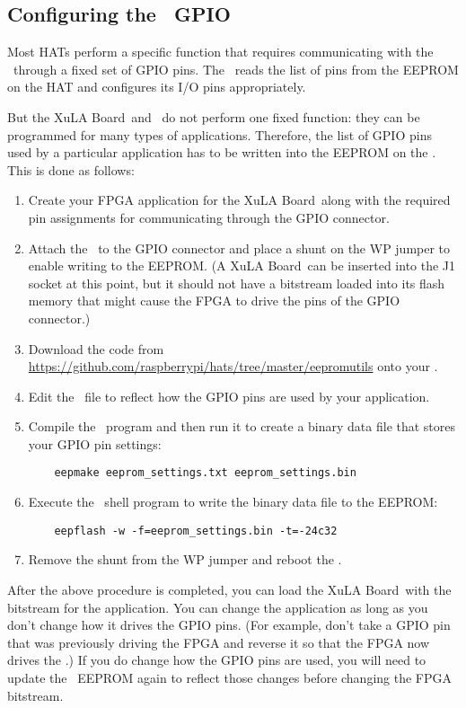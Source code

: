 \documentclass[letterpaper,11pt,oneside]{memoir}
\newcommand{\xula}{XuLA Board}
\begin{document}
\subsection{Configuring the \rpi\ GPIO \label{sec:GPIOConfig}}

Most HATs perform a specific function that requires communicating with the \rpi\
through a fixed set of GPIO pins.
The \rpi\ reads the list of pins from the EEPROM on the HAT and configures
its I/O pins appropriately.

But the \xula\ and \product\ do not perform one fixed function: they can be
programmed for many types of applications.
Therefore, the list of GPIO pins used by a particular application has to be written
into the EEPROM on the \product.
This is done as follows:

\begin{enumerate}
\item Create your FPGA application for the \xula\ along with the
	required pin assignments for communicating through the GPIO connector.
\item Attach the \product\ to the GPIO connector and place a shunt on 
	the WP jumper to enable	writing to the EEPROM.
	(A \xula\ can be inserted into the J1 socket at this point, but it
	should not have a bitstream loaded into its flash memory that might
	cause the FPGA to drive the pins of the GPIO connector.)
\item Download the code from 
	\url{https://github.com/raspberrypi/hats/tree/master/eepromutils}
	onto your \rpi.
\item Edit the \ file to reflect how the GPIO
	pins are used by your application.
\item Compile the \ program and then run it to create
	a binary data file that stores your GPIO pin settings:
	\begin{lstlisting}
	eepmake eeprom_settings.txt eeprom_settings.bin
	\end{lstlisting}
\item Execute the \ shell program to write the
	binary data file to the EEPROM:
	\begin{lstlisting}
	eepflash -w -f=eeprom_settings.bin -t=-24c32
	\end{lstlisting}
\item Remove the shunt from the WP jumper and reboot the \rpi.
\end{enumerate}

After the above procedure is completed, you can load the \xula\ with the
bitstream for the application.
You can change the application as long as you don't
change how it drives the GPIO pins.
(For example, don't take a GPIO pin that was previously driving the
FPGA and reverse it so that the FPGA now drives the \rpi.)
If you do change how the GPIO pins are used, you will need to update
the \product\ EEPROM again to reflect those changes before changing the
FPGA bitstream.
\end{document}

